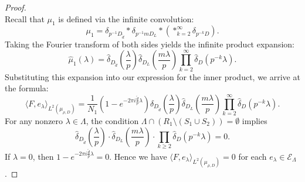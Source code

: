 \documentclass[11pt]{article}
\numberwithin{equation}{section}
\begin{document}
\begin{proof}
\begin{equation*}
\end{equation*}
Recall that $\mu_1$ is defined via the infinite convolution:
\begin{equation*}
	\mu_1 = \delta_{p^{-1}D_{\tilde{d}}} \ast \delta_{p^{-1}mD_L} \ast \left( \mathop{\ast}_{k=2}^\infty \delta_{p^{-k}D} \right).
\end{equation*}
Taking the Fourier transform of both sides yields the infinite product expansion:
\begin{equation*}
	\widehat{\mu}_1(\lambda) = \widehat{\delta}_{D_{\tilde{d}}}\left(\frac{\lambda}{p}\right) \widehat{\delta}_{D_L}\left(\frac{m\lambda}{p}\right) \prod_{k = 2}^{\infty} \widehat{\delta}_D(p^{-k}\lambda).
\end{equation*}
Substituting this expansion into our expression for the inner product, we arrive at the formula:
\begin{equation*}
	\langle F, e_\lambda \rangle_{L^2(\mu_{\rho,D})} = \frac{1}{N_1} \left( 1 - e^{-2\pi i \frac{\tilde{d}}{p}\lambda} \right) \widehat{\delta}_{D_{\tilde{d}}}\left(\frac{\lambda}{p}\right) \widehat{\delta}_{D_L}\left(\frac{m\lambda}{p}\right) \prod_{k = 2}^{\infty} \widehat{\delta}_D(p^{-k}\lambda).
\end{equation*}
For any nonzero $\lambda \in \Lambda$, the condition $\Lambda\cap (R_1 \setminus (S_1\cup S_2))=\emptyset$ implies
$$\hat{\delta}_{D_{\tilde{d}}}(\frac{\lambda}{p}) \cdot\hat{\delta}_{D_L}(\frac{m\lambda}{p}) \cdot \prod_{k \ge 2}\hat{\delta}_D(p^{-k}\lambda)=0.$$
If $\lambda=0$, then $1- e^{-2 \pi i \frac{\tilde{d}}{p} \lambda}=0$.
Hence we have $\langle F,e_{\lambda} \rangle_{L^2(\mu_{\rho,D})}=0$ for each $e_{\lambda}\in \mathcal{E}_\Lambda$. 



\end{proof}
\end{document}
